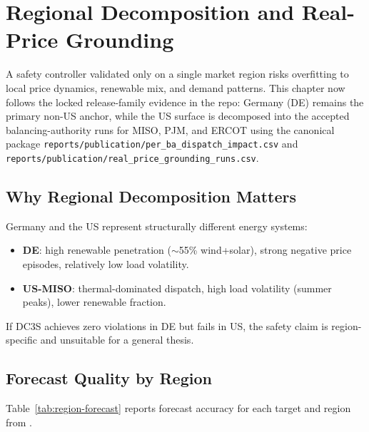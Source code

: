 
\chapter{Regional Decomposition and Real-Price Grounding}
\label{ch:regional}

A safety controller validated only on a single market region risks
overfitting to local price dynamics, renewable mix, and demand patterns.
This chapter now follows the locked release-family evidence in the repo:
Germany (DE) remains the primary non-US anchor, while the US surface is
decomposed into the accepted balancing-authority runs for MISO, PJM, and
ERCOT using the canonical package
\texttt{reports/publication/per\_ba\_dispatch\_impact.csv} and
\texttt{reports/publication/real\_price\_grounding\_runs.csv}.

\section{Why Regional Decomposition Matters}

Germany and the US represent structurally different energy systems:

\begin{itemize}
  \item \textbf{DE}: high renewable penetration ($\sim$55\% wind+solar),
    strong negative price episodes, relatively low load volatility.
  \item \textbf{US-MISO}: thermal-dominated dispatch, high load
    volatility (summer peaks), lower renewable fraction.
\end{itemize}

If DC3S achieves zero violations in DE but fails in US, the safety
claim is region-specific and unsuitable for a general thesis.

\section{Forecast Quality by Region}

Table~\ref{tab:region-forecast} reports forecast accuracy for each
target and region from .

